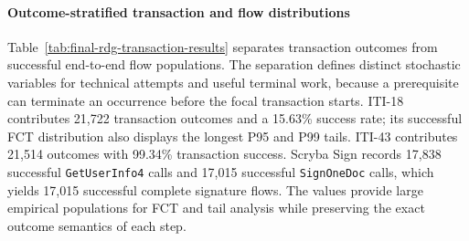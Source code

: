 \paragraph{Outcome-stratified transaction and flow distributions}
\noindent Table~\ref{tab:final-rdg-transaction-results} separates transaction outcomes
from successful end-to-end flow populations. The separation defines distinct
stochastic variables for technical attempts and useful terminal work, because
a prerequisite can terminate an occurrence before the focal transaction
starts.
\noindent ITI-18 contributes 21{,}722 transaction outcomes and a 15.63\% success
rate; its successful FCT distribution also displays the longest P95 and P99
tails. ITI-43 contributes 21{,}514 outcomes with 99.34\% transaction success.
Scryba Sign records 17{,}838 successful \texttt{GetUserInfo4} calls and 17{,}015
successful \texttt{SignOneDoc} calls, which yields 17{,}015 successful complete
signature flows. The values provide large empirical populations for FCT and
tail analysis while preserving the exact outcome semantics of each step.

\begin{table}[H]
    \centering
    \caption[Transaction-outcome populations and Flow Completion Time]{Transaction-outcome populations and successful end-to-end Flow Completion Time distributions at P50, P95, and P99. Source: Author's elaboration based on the final experimental campaign.}
    \footnotesize
    \label{tab:final-rdg-transaction-results}
\end{table}


